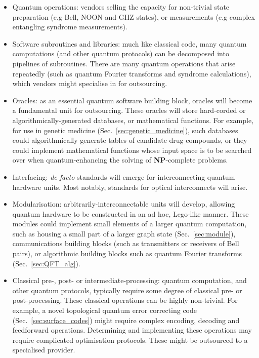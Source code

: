 \begin{itemize}
\item Quantum operations: vendors selling the capacity for non-trivial state preparation (e.g Bell, NOON and GHZ states), or measurements (e.g complex entangling syndrome measurements).

\item Software subroutines and libraries: much like classical code, many quantum computations (and other quantum protocols) can be decomposed into pipelines of subroutines. There are many quantum operations that arise repeatedly (such as quantum Fourier transforms and syndrome calculations), which vendors might specialise in for outsourcing.

\item Oracles: as an essential quantum software building block, oracles will become a fundamental unit for outsourcing. These oracles will store hard-corded or algorithmically-generated databases, or mathematical functions. For example, for use in genetic medicine (Sec.~\ref{sec:genetic_medicine}), such databases could algorithmically generate tables of candidate drug compounds, or they could implement mathematical functions whose input space is to be searched over when quantum-enhancing the solving of \textbf{NP}-complete problems.

\item Interfacing: \textit{de facto} standards will emerge for interconnecting quantum hardware units. Most notably, standards for optical interconnects will arise.

\item Modularisation: arbitrarily-interconnectable units will develop, allowing quantum hardware to be constructed in an ad hoc, Lego-like manner. These modules could implement small elements of a larger quantum computation, such as housing a small part of a larger graph state (Sec.~\ref{sec:module}), communications building blocks (such as transmitters or receivers of Bell pairs), or algorithmic building blocks such as quantum Fourier transforms (Sec.~\ref{sec:QFT_alg}).

\item Classical pre-, post- or intermediate-processing: quantum computation, and other quantum protocols, typically require some degree of classical pre- or post-processing. These classical operations can be highly non-trivial. For example, a novel topological quantum error correcting code (Sec.~\ref{sec:surface_codes}) might require complex encoding, decoding and feedforward operations. Determining and implementing these operations may require complicated optimisation protocols. These might be outsourced to a specialised provider.


\end{itemize}
